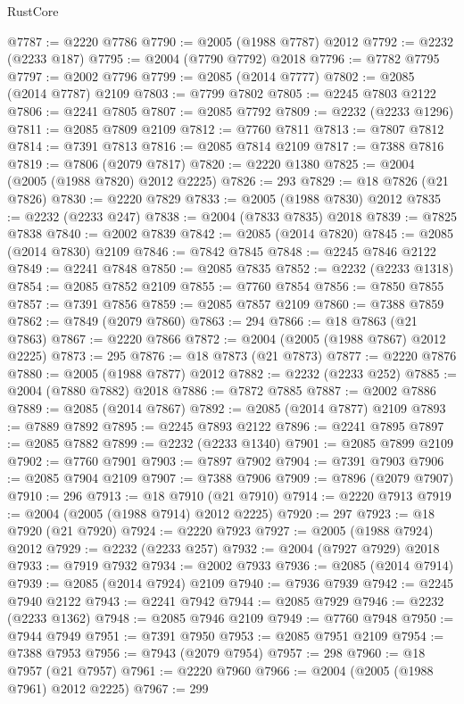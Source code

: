 \begin{lexlean}{RustCore}
\begin{coremodule}
@7787 := @2220 @7786
@7790 := @2005 (@1988 @7787) @2012
@7792 := @2232 (@2233 @187)
@7795 := @2004 (@7790 @7792) @2018
@7796 := @7782 @7795
@7797 := @2002 @7796
@7799 := @2085 (@2014 @7777)
@7802 := @2085 (@2014 @7787) @2109
@7803 := @7799 @7802
@7805 := @2245 @7803 @2122
@7806 := @2241 @7805
@7807 := @2085 @7792
@7809 := @2232 (@2233 @1296)
@7811 := @2085 @7809 @2109
@7812 := @7760 @7811
@7813 := @7807 @7812
@7814 := @7391 @7813
@7816 := @2085 @7814 @2109
@7817 := @7388 @7816
@7819 := @7806 (@2079 @7817)
@7820 := @2220 @1380
@7825 := @2004 (@2005 (@1988 @7820) @2012 @2225)
@7826 := 293
@7829 := @18 @7826 (@21 @7826)
@7830 := @2220 @7829
@7833 := @2005 (@1988 @7830) @2012
@7835 := @2232 (@2233 @247)
@7838 := @2004 (@7833 @7835) @2018
@7839 := @7825 @7838
@7840 := @2002 @7839
@7842 := @2085 (@2014 @7820)
@7845 := @2085 (@2014 @7830) @2109
@7846 := @7842 @7845
@7848 := @2245 @7846 @2122
@7849 := @2241 @7848
@7850 := @2085 @7835
@7852 := @2232 (@2233 @1318)
@7854 := @2085 @7852 @2109
@7855 := @7760 @7854
@7856 := @7850 @7855
@7857 := @7391 @7856
@7859 := @2085 @7857 @2109
@7860 := @7388 @7859
@7862 := @7849 (@2079 @7860)
@7863 := 294
@7866 := @18 @7863 (@21 @7863)
@7867 := @2220 @7866
@7872 := @2004 (@2005 (@1988 @7867) @2012 @2225)
@7873 := 295
@7876 := @18 @7873 (@21 @7873)
@7877 := @2220 @7876
@7880 := @2005 (@1988 @7877) @2012
@7882 := @2232 (@2233 @252)
@7885 := @2004 (@7880 @7882) @2018
@7886 := @7872 @7885
@7887 := @2002 @7886
@7889 := @2085 (@2014 @7867)
@7892 := @2085 (@2014 @7877) @2109
@7893 := @7889 @7892
@7895 := @2245 @7893 @2122
@7896 := @2241 @7895
@7897 := @2085 @7882
@7899 := @2232 (@2233 @1340)
@7901 := @2085 @7899 @2109
@7902 := @7760 @7901
@7903 := @7897 @7902
@7904 := @7391 @7903
@7906 := @2085 @7904 @2109
@7907 := @7388 @7906
@7909 := @7896 (@2079 @7907)
@7910 := 296
@7913 := @18 @7910 (@21 @7910)
@7914 := @2220 @7913
@7919 := @2004 (@2005 (@1988 @7914) @2012 @2225)
@7920 := 297
@7923 := @18 @7920 (@21 @7920)
@7924 := @2220 @7923
@7927 := @2005 (@1988 @7924) @2012
@7929 := @2232 (@2233 @257)
@7932 := @2004 (@7927 @7929) @2018
@7933 := @7919 @7932
@7934 := @2002 @7933
@7936 := @2085 (@2014 @7914)
@7939 := @2085 (@2014 @7924) @2109
@7940 := @7936 @7939
@7942 := @2245 @7940 @2122
@7943 := @2241 @7942
@7944 := @2085 @7929
@7946 := @2232 (@2233 @1362)
@7948 := @2085 @7946 @2109
@7949 := @7760 @7948
@7950 := @7944 @7949
@7951 := @7391 @7950
@7953 := @2085 @7951 @2109
@7954 := @7388 @7953
@7956 := @7943 (@2079 @7954)
@7957 := 298
@7960 := @18 @7957 (@21 @7957)
@7961 := @2220 @7960
@7966 := @2004 (@2005 (@1988 @7961) @2012 @2225)
@7967 := 299

\end{coremodule}
\end{lexlean}

